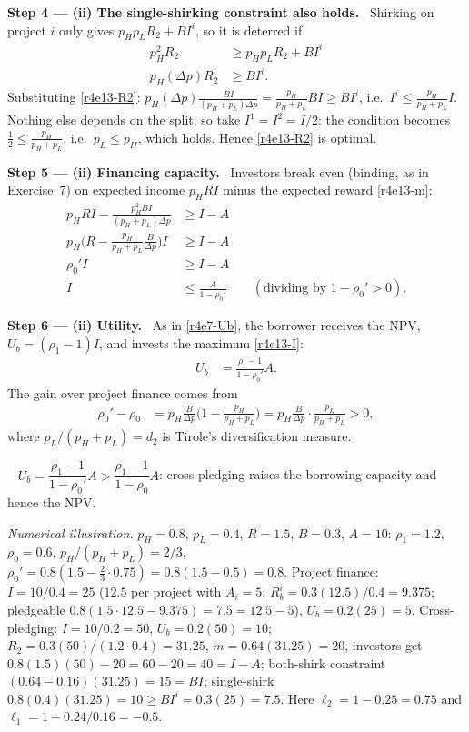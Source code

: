 \documentclass[11pt,a4paper]{article}
\newcommand{\step}[2]{\par\medskip\noindent\textbf{Step #1 --- #2.}~}
\newcommand{\answer}[1]{\par\smallskip\noindent\fbox{\textbf{Answer #1.}}~}
\begin{document}
\step{4}{(ii) The single-shirking constraint also holds} Shirking on project $i$ only gives
$p_Hp_LR_2+BI^i$, so it is deterred if
\begin{align}
  p_H^2R_2 &\ge p_Hp_LR_2+BI^i \nonumber\\
  p_H(\Delta p)R_2 &\ge BI^i. \nonumber
\end{align}
Substituting \eqref{r4e13-R2}: $p_H(\Delta p)\frac{BI}{(p_H+p_L)\Delta p}=\frac{p_H}{p_H+p_L}BI\ge BI^i$,
i.e.\ $I^i\le\frac{p_H}{p_H+p_L}I$. Nothing else depends on the split, so take $I^1=I^2=I/2$:
the condition becomes $\frac12\le\frac{p_H}{p_H+p_L}$, i.e.\ $p_L\le p_H$, which holds. Hence
\eqref{r4e13-R2} is optimal.

\step{5}{(ii) Financing capacity} Investors break even (binding, as in Exercise~7) on expected
income $p_HRI$ minus the expected reward \eqref{r4e13-m}:
\begin{align}
  p_HRI-\frac{p_H^2BI}{(p_H+p_L)\Delta p} &\ge I-A \nonumber\\
  p_H\Big(R-\frac{p_H}{p_H+p_L}\frac{B}{\Delta p}\Big)I &\ge I-A \nonumber\\
  \rho_0'I &\ge I-A \nonumber\\
  I &\le \frac{A}{1-\rho_0'} \qquad(\text{dividing by }1-\rho_0'>0). \label{r4e13-I}
\end{align}

\step{6}{(ii) Utility} As in \eqref{r4e7-Ub}, the borrower receives the NPV, $U_b=(\rho_1-1)I$,
and invests the maximum \eqref{r4e13-I}:
\begin{align}
  U_b &= \frac{\rho_1-1}{1-\rho_0'}A. \label{r4e13-cp}
\end{align}
The gain over project finance comes from
\begin{align}
  \rho_0'-\rho_0 &= p_H\frac{B}{\Delta p}\Big(1-\frac{p_H}{p_H+p_L}\Big)
                  = p_H\frac{B}{\Delta p}\cdot\frac{p_L}{p_H+p_L}>0, \nonumber
\end{align}
where $p_L/(p_H+p_L)=d_2$ is Tirole's diversification measure.

\answer{(ii)} $U_b=\dfrac{\rho_1-1}{1-\rho_0'}A>\dfrac{\rho_1-1}{1-\rho_0}A$: cross-pledging
raises the borrowing capacity and hence the NPV.

\emph{Numerical illustration.} $p_H=0.8$, $p_L=0.4$, $R=1.5$, $B=0.3$, $A=10$: $\rho_1=1.2$,
$\rho_0=0.6$, $p_H/(p_H+p_L)=2/3$, $\rho_0'=0.8(1.5-\tfrac23\cdot0.75)=0.8(1.5-0.5)=0.8$.
Project finance: $I=10/0.4=25$ ($12.5$ per project with $A_i=5$; $R_b^i=0.3(12.5)/0.4=9.375$;
pledgeable $0.8(1.5\cdot12.5-9.375)=7.5=12.5-5$), $U_b=0.2(25)=5$. Cross-pledging:
$I=10/0.2=50$, $U_b=0.2(50)=10$; $R_2=0.3(50)/(1.2\cdot0.4)=31.25$, $m=0.64(31.25)=20$, investors
get $0.8(1.5)(50)-20=60-20=40=I-A$; both-shirk constraint $(0.64-0.16)(31.25)=15=BI$;
single-shirk $0.8(0.4)(31.25)=10\ge BI^i=0.3(25)=7.5$. Here $\ell_2=1-0.25=0.75$ and
$\ell_1=1-0.24/0.16=-0.5$.
\end{document}
